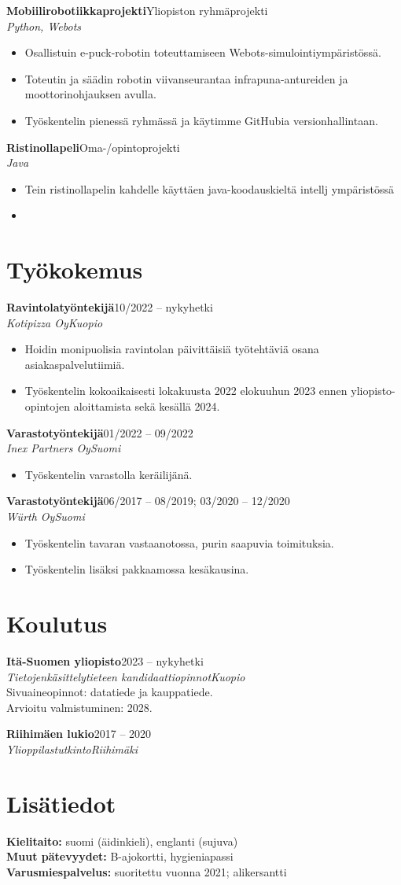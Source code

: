 \documentclass[a4paper,10pt]{article}
\newcommand{\cvItem}[1]{\item \small{#1}}
\newcommand{\cvSubheading}[4]{%
  \textbf{#1}\hfill {\small #2}\\
  \textit{\small #3}\hfill \textit{\small #4}\\[-3pt]
}
\newcommand{\cvProject}[3]{%
  \textbf{#1}\hfill {\small #2}\\
  \textit{\small #3}\\[-3pt]
}
\begin{document}
\cvProject{Mobiilirobotiikkaprojekti}{Yliopiston ryhmäprojekti}{Python, Webots}
\begin{itemize}
  \cvItem{Osallistuin e-puck-robotin toteuttamiseen Webots-simulointiympäristössä.}
  \cvItem{Toteutin ja säädin robotin viivanseurantaa infrapuna-antureiden ja moottorinohjauksen avulla.}
  \cvItem{Työskentelin pienessä ryhmässä ja käytimme GitHubia versionhallintaan.}
\end{itemize}

\cvProject{Ristinollapeli}{Oma-/opintoprojekti}{Java}
\begin{itemize}
  \cvItem{Tein ristinollapelin kahdelle käyttäen java-koodauskieltä intellj ympäristössä}
  \cvItem{}
\end{itemize}

\section*{Työkokemus}

\cvSubheading{Ravintolatyöntekijä}{10/2022 -- nykyhetki}{Kotipizza Oy}{Kuopio}
\begin{itemize}
  \cvItem{Hoidin monipuolisia ravintolan päivittäisiä työtehtäviä osana asiakaspalvelutiimiä.}
  \cvItem{Työskentelin kokoaikaisesti lokakuusta 2022 elokuuhun 2023 ennen yliopisto-opintojen aloittamista sekä kesällä 2024.}
\end{itemize}

\cvSubheading{Varastotyöntekijä}{01/2022 -- 09/2022}{Inex Partners Oy}{Suomi}
\begin{itemize}
  \cvItem{Työskentelin varastolla keräilijänä.}
\end{itemize}

\cvSubheading{Varastotyöntekijä}{06/2017 -- 08/2019; 03/2020 -- 12/2020}{Würth Oy}{Suomi}
\begin{itemize}
  \cvItem{Työskentelin tavaran vastaanotossa, purin saapuvia toimituksia.}
  \cvItem{Työskentelin lisäksi pakkaamossa kesäkausina.}
\end{itemize}

\section*{Koulutus}

\cvSubheading{Itä-Suomen yliopisto}{2023 -- nykyhetki}{Tietojenkäsittelytieteen kandidaattiopinnot}{Kuopio}
\small Sivuaineopinnot: datatiede ja kauppatiede.\\
Arvioitu valmistuminen: 2028.
\normalsize

\cvSubheading{Riihimäen lukio}{2017 -- 2020}{Ylioppilastutkinto}{Riihimäki}

\section*{Lisätiedot}
\small
\textbf{Kielitaito:} suomi (äidinkieli), englanti (sujuva)\\
\textbf{Muut pätevyydet:} B-ajokortti, hygieniapassi\\
\textbf{Varusmiespalvelus:} suoritettu vuonna 2021; alikersantti
\normalsize
\end{document}
